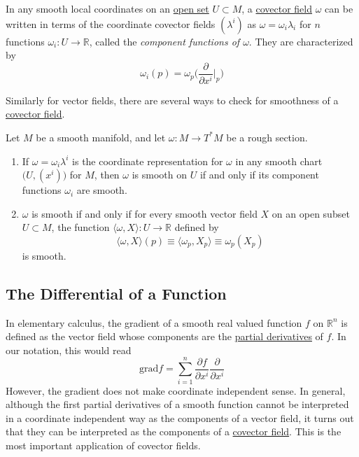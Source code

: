\documentclass{article}
\newcounter{definition}[section]
\begin{document}
    \begin{definition}
      \label{def:component-functions-of-omega}
    In any smooth local coordinates on an \hyperref[pst-def:open-set]{open set} $U \subset M$, a \hyperref[def:covector-field]{covector field} $\omega$ can be written in terms of the coordinate covector fields $(\lambda^i)$ as $\omega = \omega_i \lambda_i$ for $n$ functions $\omega_i: U \to \mathbb{R}$, called the \textit{component functions of $\omega$}. They are characterized by 
    \begin{equation}
      \omega_i (p) = \omega_p \bigg( \frac{\partial}{\partial x^i} \bigg|_p \bigg)
    \end{equation}
    \end{definition}

    Similarly for vector fields, there are several ways to check for smoothness of a \hyperref[def:covector-field]{covector field}. 

    \begin{lemma}
      \label{thm:smoothness-criteria-for-covector-fields}
    Let $M$ be a smooth manifold, and let $\omega: M \to T^* M$ be a rough section. 
    \begin{enumerate}
        \item If $\omega = \omega_i \lambda^i$ is the coordinate representation for $\omega$ in any smooth chart $\big(U, (x^i)\big)$ for $M$, then $\omega$ is smooth on $U$ if and only if its component functions $\omega_i$ are smooth. 
        \item $\omega$ is smooth if and only if for every smooth vector field $X$ on an open subset $U \subset M$, the function $\langle \omega, X \rangle: U \to \mathbb{R}$ defined by 
        \begin{equation}
          \langle \omega, X \rangle (p) \equiv \langle \omega_p, X_p \rangle \equiv \omega_p (X_p)
        \end{equation}
        is smooth. 
    \end{enumerate}
    \end{lemma}

  \subsection{The Differential of a Function}

    In elementary calculus, the gradient of a smooth real valued function $f$ on $\mathbb{R}^n$ is defined as the vector field whose components are the \hyperref[mv-def:partial-derivative]{partial derivatives} of $f$. In our notation, this would read
    \begin{equation}
      \text{grad} f = \sum_{i=1}^n \frac{\partial f}{\partial x^i} \frac{\partial}{\partial x^i}
    \end{equation}
    However, the gradient does not make coordinate independent sense. In general, although the first partial derivatives of a smooth function cannot be interpreted in a coordinate independent way as the components of a vector field, it turns out that they can be interpreted as the components of a \hyperref[def:covector-field]{covector field}. This is the most important application of covector fields. 
\end{document}
